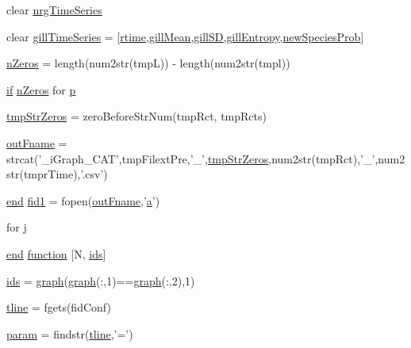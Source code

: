 \begin{DoxyCompactItemize}
\item 
clear \hyperlink{a00022_ad5f4092827ae220bd7c53532aaaa0590}{nrg\-Time\-Series}
\item 
clear \hyperlink{a00022_ad7c5b4f5873064fed5ce2b70ce073f91}{gill\-Time\-Series} = \mbox{[}\hyperlink{a00022_afc6b38657a313b9f1de2ee356910b6ee}{rtime},\hyperlink{a00022_a7d36858faf2f8bb5963306c86db2b549}{gill\-Mean},\hyperlink{a00022_a187931f510c22818692d094c8026ebd1}{gill\-S\-D},\hyperlink{a00022_aef2e92fdea881fe7819bf51b2d7e0783}{gill\-Entropy},\hyperlink{a00022_aa66147edba72bc0b9cf591cd7475396f}{new\-Species\-Prob}\mbox{]}
\item 
\hyperlink{a00022_ac4353d99277795cadf898255e2c73c71}{n\-Zeros} = length(num2str(tmp\-L)) -\/ length(num2str(tmpl))
\item 
\hyperlink{a00024_a01d55766b8058903dd360b4bda71f9f5}{if} \hyperlink{a00022_ac4353d99277795cadf898255e2c73c71}{n\-Zeros} for \hyperlink{a00022_aa2b4c35904308d35fc5d606a429e608d}{p}
\item 
\hyperlink{a00022_aacf946bee61c4c535a7bf6d85f55f66a}{tmp\-Str\-Zeros} = zero\-Before\-Str\-Num(tmp\-Rct, tmp\-Rcts)
\item 
\hyperlink{a00022_abf4ae8c34e865742e8ee979ed6e03384}{out\-Fname} = strcat('\-\_\-i\-Graph\-\_\-\-C\-A\-T',tmp\-Filext\-Pre,'\-\_\-',\hyperlink{a00022_aacf946bee61c4c535a7bf6d85f55f66a}{tmp\-Str\-Zeros},num2str(tmp\-Rct),'\-\_\-',num2str(tmpr\-Time),'.csv')
\item 
\hyperlink{a00019_afb358f48b1646c750fb9da6c6585be2b}{end} \hyperlink{a00022_ae941ef58ebac7f05a8095badde51c07b}{fid1} = fopen(\hyperlink{a00022_abf4ae8c34e865742e8ee979ed6e03384}{out\-Fname},'\hyperlink{a00029_a2ffdbad9ea59541e59cbd2b938e0770c}{a}')
\item 
for \hyperlink{a00022_ad34e9c7e9ae69ae0b9f1866faed5e4ad}{j}
\item 
\hyperlink{a00019_afb358f48b1646c750fb9da6c6585be2b}{end} \hyperlink{a00022_af12e4ac3392d0671e386d46e2424a06a}{function} \mbox{[}N, \hyperlink{a00022_a0a9b879f29cc1e1e03ffc7851f7c19b9}{ids}\mbox{]}
\item 
\hyperlink{a00022_a0a9b879f29cc1e1e03ffc7851f7c19b9}{ids} = \hyperlink{a00022_a2745e24fec2a44d51f4452beb1596bd3}{graph}(\hyperlink{a00022_a2745e24fec2a44d51f4452beb1596bd3}{graph}(\-:,1)==\hyperlink{a00022_a2745e24fec2a44d51f4452beb1596bd3}{graph}(\-:,2),1)
\item 
\hyperlink{a00022_a6791897869706b835f1a5d305739a415}{tline} = fgets(fid\-Conf)
\item 
\hyperlink{a00022_a51f20d6b1b54a2eee3be0e8adc96a0ae}{param} = findstr(\hyperlink{a00027_a6791897869706b835f1a5d305739a415}{tline},'=')
\end{DoxyCompactItemize}


